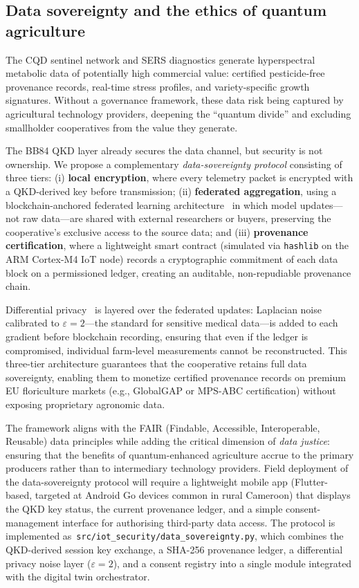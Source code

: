 \documentclass[11pt,a4paper]{article}
\begin{document}
\subsection{Data sovereignty and the ethics of quantum agriculture}
\label{SI-sec:datasovereignty}

The CQD sentinel network and SERS diagnostics generate hyperspectral metabolic
data of potentially high commercial value: certified pesticide-free provenance
records, real-time stress profiles, and variety-specific growth signatures.
Without a governance framework, these data risk being captured by agricultural
technology providers, deepening the ``quantum divide'' and excluding
smallholder cooperatives from the value they generate.

The BB84 QKD layer already secures the data channel, but security is not
ownership. We propose a complementary \textit{data-sovereignty protocol}
consisting of three tiers: (i) \textbf{local encryption}, where every telemetry
packet is encrypted with a QKD-derived key before transmission; (ii)
\textbf{federated aggregation}, using a blockchain-anchored federated learning
architecture~\cite{AgriFLChain2025} in which model updates---not raw data---are
shared with external researchers or buyers, preserving the cooperative's
exclusive access to the source data; and (iii) \textbf{provenance
certification}, where a lightweight smart contract (simulated via
\texttt{hashlib} on the ARM Cortex-M4 IoT node) records a cryptographic
commitment of each data block on a permissioned ledger, creating an
auditable, non-repudiable provenance chain.

Differential privacy~\cite{Zafar2025} is layered over the federated updates:
Laplacian noise calibrated to $\varepsilon = 2$---the standard for sensitive
medical data---is added to each gradient before blockchain recording, ensuring
that even if the ledger is compromised, individual farm-level measurements
cannot be reconstructed. This three-tier architecture guarantees that the
cooperative retains full data sovereignty, enabling them to monetize certified
provenance records on premium EU floriculture markets (e.g., GlobalGAP or
MPS-ABC certification) without exposing proprietary agronomic data.

The framework aligns with the FAIR (Findable, Accessible, Interoperable,
Reusable) data principles while adding the critical dimension of \textit{data
justice}: ensuring that the benefits of quantum-enhanced agriculture accrue to
the primary producers rather than to intermediary technology providers. Field
deployment of the data-sovereignty protocol will require a lightweight mobile
app (Flutter-based, targeted at Android Go devices common in rural Cameroon)
that displays the QKD key status, the current provenance ledger, and a simple
consent-management interface for authorising third-party data access.
The protocol is implemented as~\texttt{src/iot\_security/data\_sovereignty.py},
which combines the QKD-derived session key exchange, a SHA-256 provenance ledger,
a differential privacy noise layer ($\varepsilon = 2$), and a consent registry
into a single module integrated with the digital twin orchestrator.
\end{document}
